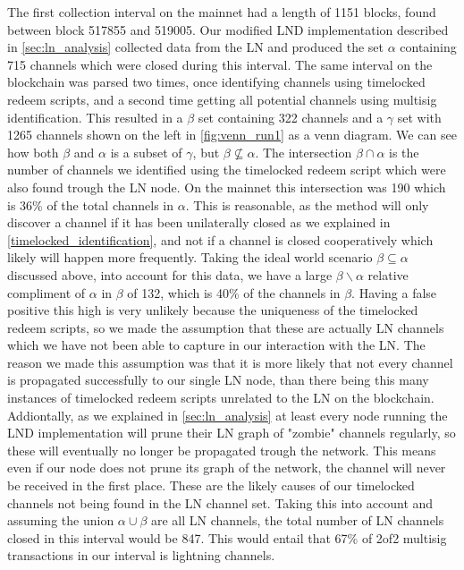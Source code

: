 The first collection interval on the mainnet had a length of 1151 blocks, found between block 517855 and 519005. Our modified LND implementation described in \cref{sec:ln_analysis} collected data from the LN and produced the set $\alpha$ containing 715 channels which were closed during this interval. The same interval on the blockchain was parsed two times, once identifying channels using timelocked redeem scripts, and a second time getting all potential channels using multisig identification. This resulted in a $\beta$ set containing 322 channels and a $\gamma$ set with 1265 channels shown on the left in \cref{fig:venn_run1} as a venn diagram. We can see how both $\beta$ and $\alpha$ is a subset of $\gamma$, but $\beta \not\subseteq \alpha$. The intersection $\beta \cap \alpha$ is the number of channels we identified using the timelocked redeem script which were also found trough the LN node. On the mainnet this intersection was 190 which is 36\% of the total channels in $\alpha$. This is reasonable, as the method will only discover a channel if it has been unilaterally closed as we explained in \cref{timelocked_identification}, and not if a channel is closed cooperatively which likely will happen more frequently. Taking the ideal world scenario $\beta \subseteq \alpha$ discussed above, into account for this data, we have a large $\beta \backslash{} \alpha$ relative compliment of $\alpha$ in $\beta$ of 132, which is 40\% of the channels in $\beta$. Having a false positive this high is very unlikely because the uniqueness of the timelocked redeem scripts, so we made the assumption that these are actually LN channels which we have not been able to capture in our interaction with the LN. The reason we made this assumption was that it is more likely that not every channel is propagated successfully to our single LN node, than there being this many instances of timelocked redeem scripts unrelated to the LN on the blockchain. Addiontally, as we explained in \cref{sec:ln_analysis} at least every node running the LND implementation will prune their LN graph of "zombie" channels regularly, so these will eventually no longer be propagated trough the network. This means even if our node does not prune its graph of the network, the channel will never be received in the first place. These are the likely causes of our timelocked channels not being found in the LN channel set.
Taking this into account and assuming the union $\alpha \cup \beta$ are all LN channels, the total number of LN channels closed in this interval would be 847. This would entail that 67\% of 2of2 multisig transactions in our interval is lightning channels. 
\\

